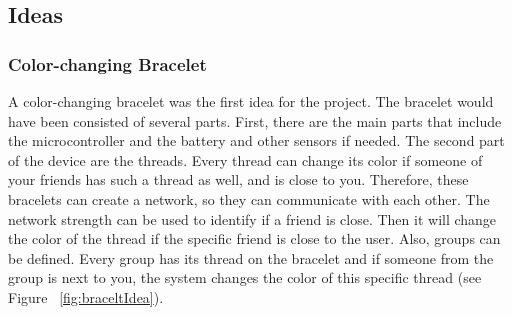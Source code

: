 \documentclass[04_projectProcess.tex]{subfiles}
\begin{document}
    \subsection{Ideas}
    \label{Ideas}

    \subsubsection{Color-changing Bracelet}
    \begin{flushleft}
        A color-changing bracelet was the first idea for the project. The bracelet would have been 
        consisted of several parts. First, there are the main parts that include the microcontroller 
        and the battery and other sensors if needed. The second part of the device are the threads. 
        Every thread can change its color if someone of your friends has such a thread as well, and 
        is close to you. Therefore, these bracelets can create a network, so they can communicate 
        with each other. The network strength can be used to identify if a friend is close. Then it 
        will change the color of the thread if the specific friend is close to the user. Also, groups 
        can be defined. Every group has its thread on the bracelet and if someone from the group 
        is next to you, the system changes the color of this specific thread (see Figure ~\ref{fig:braceltIdea}).
    \end{flushleft}
\end{document}

